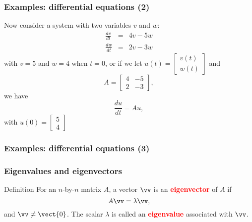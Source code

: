 \begin{frame}
  \frametitle{Examples: differential equations (2)}
  Now consider a system with two variables $v$ and $w$:
  \[
  \begin{array}{lcr}
    \frac{dv}{dt} &=& 4v - 5w \\
    \frac{dw}{dt} &=& 2v - 3w
  \end{array}
  \]
  with $v=5$ and $w=4$ when $t=0$, \pause or if we let
  $u(t)=\begin{bmatrix}v(t)\\ w(t)\end{bmatrix}$ and
  \[
  A = \begin{bmatrix}
    4 & -5\\
    2 & -3
  \end{bmatrix},
  \]
  we have \[
  \frac{du}{dt} = Au,
  \]
  with $u(0) = \begin{bmatrix} 5 \\ 4 \end{bmatrix}$
\end{frame}

\begin{frame}
  \frametitle{Examples: differential equations (3)}
\end{frame}

\begin{frame}
  \frametitle{Eigenvalues and eigenvectors}
  
  \begin{block}{Definition}
    For an $n$-by-$n$ matrix $A$, a vector $\vv$ is an
    \textcolor{red}{\bf eigenvector} of $A$ if
    \[
    A\vv = \lambda\vv,
    \]
    and $\vv\neq\vect{0}$.
    The scalar $\lambda$ is called an \textcolor{red}{\bf eigenvalue}
    associated with $\vv$.
  \end{block}
\end{frame}

